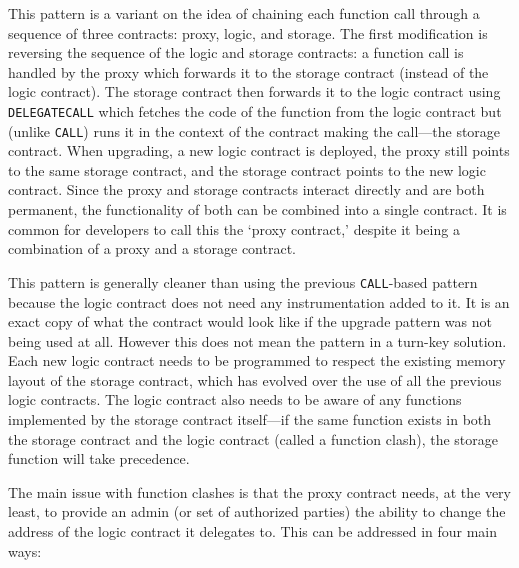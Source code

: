 
This pattern is a variant on the idea of chaining each function call through a sequence of three contracts: proxy, logic, and storage. The first modification is reversing the sequence of the logic and storage contracts: a function call is handled by the proxy which forwards it to the storage contract (instead of the logic contract). The storage contract then forwards it to the logic contract using \texttt{DELEGATECALL} which fetches the code of the function from the logic contract but (unlike \texttt{CALL}) runs it in the context of the contract making the call---\ie the storage contract. When upgrading, a new logic contract is deployed, the proxy still points to the same storage contract, and the storage contract points to the new logic contract. Since the proxy and storage contracts interact directly and are both permanent, the functionality of both can be combined into a single contract. It is common for developers to call this the `proxy contract,' despite it being a combination of a proxy and a storage contract. 

This pattern is generally cleaner than using the previous \texttt{CALL}-based pattern because the logic contract does not need any instrumentation added to it. It is an exact copy of what the contract would look like if the upgrade pattern was not being used at all. However this does not mean the pattern in a turn-key solution. Each new logic contract needs to be programmed to respect the existing memory layout of the storage contract, which has evolved over the use of all the previous logic contracts. The logic contract also needs to be aware of any functions implemented by the storage contract itself---if the same function exists in both the storage contract and the logic contract (called a function clash), the storage function will take precedence.


The main issue with function clashes is that the proxy contract needs, at the very least, to provide an admin (or set of authorized parties) the ability to change the address of the logic contract it delegates to. This can be addressed in four main ways:

